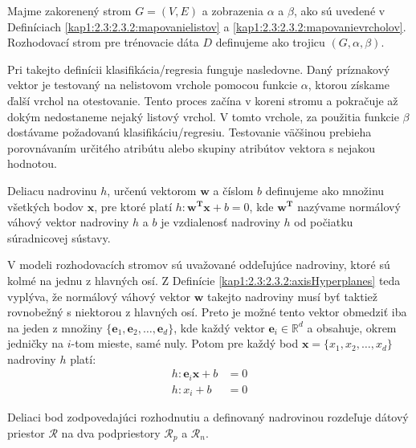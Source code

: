 \begin{def-sk}\label{kap1:2.3:2.3.2:DT}
Majme zakorenený strom $G = (V,E)$ a zobrazenia $\alpha$ a $\beta$, ako sú uvedené v Definíciach \ref{kap1:2.3:2.3.2:mapovanielistov} a \ref{kap1:2.3:2.3.2:mapovanievrcholov}. Rozhodovací strom pre trénovacie dáta $D$ definujeme ako trojicu $(G,\alpha,\beta)$.
\end{def-sk}

Pri takejto definícii klasifikácia/regresia funguje nasledovne. Daný príznakový vektor je testovaný na nelistovom vrchole pomocou funkcie $\alpha$, ktorou získame ďalší vrchol na otestovanie. Tento proces začína v koreni stromu a pokračuje až dokým nedostaneme nejaký listový vrchol. V tomto vrchole, za použitia funkcie $\beta$ dostávame požadovanú klasifikáciu/regresiu.
Testovanie väčšinou prebieha porovnávaním určitého atribútu alebo skupiny atribútov vektora s nejakou hodnotou.

\begin{def-sk}\label{kap1:2.3:2.3.2:axisHyperplanes}
Deliacu nadrovinu $h$, určenú vektorom $\mathbf{w}$ a číslom $b$ definujeme ako množinu všetkých bodov $\mathbf{x}$, pre ktoré platí $h:\mathbf{w^{T}x} + b = 0$, kde $\mathbf{w^{T}}$ nazývame normálový váhový vektor nadroviny $h$ a $b$ je vzdialenosť nadroviny $h$ od počiatku súradnicovej sústavy.
\end{def-sk}

V modeli rozhodovacích stromov sú uvažované oddeľujúce nadroviny, ktoré sú kolmé na jednu z hlavných osí. Z Definície \ref{kap1:2.3:2.3.2:axisHyperplanes} teda vyplýva, že normálový váhový vektor $\mathbf{w}$ takejto nadroviny musí byť taktiež rovnobežný s niektorou z hlavných osí. Preto je možné tento vektor obmedziť iba na jeden z množiny $\{\mathbf{e}_1,\mathbf{e}_2,\ldots,\mathbf{e}_d\}$, kde každý vektor $\mathbf{e}_i \in \mathbb{R}^{d}$ a obsahuje, okrem jedničky na $i$-tom mieste, samé nuly. Potom pre každý bod $\mathbf{x} = \{x_{1},x_{2},\ldots,x_{d}\}$ nadroviny $h$ platí:
\begin{align}
h:\mathbf{e}_i\mathbf{x} + b &= 0 \nonumber\\
h:x_{i} + b &= 0 \label{kap1:2.3:2.3.2:eq1}
\end{align}

\begin{def-sk}\label{kap1:2.3:2.3.2:splitPoints}
Deliaci bod zodpovedajúci rozhodnutiu a definovaný nadrovinou rozdeľuje dátový priestor $\mathcal{R}$ na dva podpriestory $\mathcal{R}_{p}$ a $\mathcal{R}_{n}$. 
\end{def-sk}

